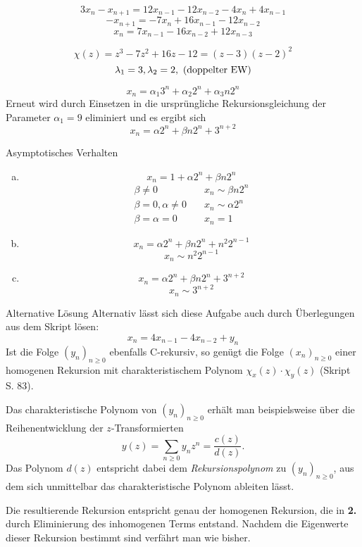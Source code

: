 \begin{flushenum}
\begin{enumerate}[(a)]
      \[ 3x_{n} - x_{n+1} = 12x_{n-1} - 12x_{n-2} - 4x_{n} + 4x_{n-1} \]
      \[ -x_{n+1} = -7x_{n} + 16x_{n-1} - 12x_{n-2} \]
      \[ x_{n} = 7x_{n-1} - 16x_{n-2} + 12x_{n-3} \]

      \[ \chi(z) = z^{3} - 7z^{2} + 16z - 12 = (z - 3) (z - 2)^{2} \]
      \[ \lambda_{1} = 3, \lambda_{2} = 2, \textnormal{ (doppelter EW)} \]

      \[ x_{n} = \alpha_{1}3^{n} + \alpha_{2}2^{n} + \alpha_{3}n2^{n} \]
      Erneut wird durch Einsetzen in die ursprüngliche Rekursionsgleichung der
      Parameter $\alpha_{1} = 9$ eliminiert und es ergibt sich
      \[ x_{n} = \alpha 2^{n} + \beta n2^{n} + 3^{n+2} \]
  \end{enumerate}
  \begin{paragraph}{Asymptotisches Verhalten}
    \begin{enumerate}[(a)]
      \item \[ x_{n} = 1 + \alpha 2^{n} + \beta n2^{n} \]
        \begin{equation*}
          \begin{split}
           \beta \not= 0 &\quad x_{n} \sim \beta n2^{n} \\
           \beta = 0, \alpha \not= 0 &\quad x_{n} \sim \alpha 2^{n} \\
           \beta = \alpha = 0 & \quad x_{n} = 1
          \end{split}
        \end{equation*}
      \item \[ x_{n} = \alpha2^{n} + \beta n2^{n} + n^{2}2^{n-1}\]
        \[ x_{n} \sim n^{2}2^{n-1} \]
      \item \[ x_{n} = \alpha 2^{n} + \beta n2^{n} + 3^{n+2} \]
        \[ x_{n} \sim 3^{n+2} \]
    \end{enumerate}
  \end{paragraph}
  \begin{paragraph}{Alternative Lösung}
	Alternativ lässt sich diese Aufgabe auch durch Überlegungen aus dem
	Skript lösen:
	\[ x_{n} = 4x_{n-1} - 4x_{n-2} + y_{n} \]
	Ist die Folge $(y_n)_{n\geq 0}$ ebenfalls C-rekursiv, so genügt die
	Folge $(x_n)_{n\geq 0}$ einer homogenen Rekursion mit
	charakteristischem Polynom $\chi_x(z)\cdot\chi_y(z)$ (Skript S. 83).

	Das charakteristische Polynom von $(y_n)_{n\geq 0}$ erhält man
	beispielsweise über die Rei\-hen\-ent\-wicklung der $z$-Transformierten
	\[ y(z) = \sum_{n\geq 0} y_n z^n = \frac{c(z)}{d(z)}. \]
	Das Polynom $d(z)$ entspricht dabei dem \textit{Rekursionspolynom} zu
	$(y_n)_{n\geq 0}$, aus dem sich unmittelbar das charakteristische
	Polynom ableiten lässt.

	Die resultierende Rekursion entspricht genau der homogenen Rekursion,
	die in \textbf{2.} durch Eliminierung des inhomogenen Terms entstand.
	Nachdem die Eigenwerte dieser Rekursion bestimmt sind verfährt man wie
	bisher.
  \end{paragraph}
\end{flushenum}
